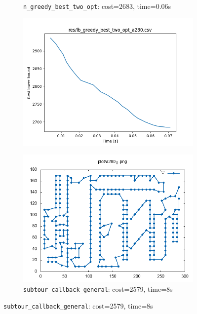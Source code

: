 \begin{figure}[!h]
\begin{subfigure}{.5\columnwidth}
		\caption{\texttt{n\_greedy\_best\_two\_opt}: cost=2683, time=0.06s}
		\label{fig:a280_25}
	\end{subfigure}
	\begin{subfigure}{.5\columnwidth}
		\centering
		\includegraphics[width=\columnwidth]{../res/lb_greedy_best_two_opt_a280.png}
		\caption{}
		\label{fig:lb_greedy_best_two_opt_a280}
	\end{subfigure}
	\begin{subfigure}{.5\columnwidth}
		\centering
		\includegraphics[width=\columnwidth]{../res/a280_0.png}
		\caption{\texttt{subtour\_callback\_general}: cost=2579, time=8s}
		\label{fig:a280_0}
	\end{subfigure}
\end{figure}

